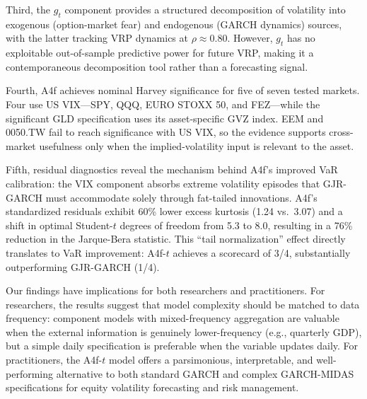 \documentclass[12pt,a4paper]{article}
\begin{document}
Third, the $g_t$ component provides a structured decomposition of volatility into exogenous (option-market fear) and endogenous (GARCH dynamics) sources, with the latter tracking VRP dynamics at $\rho \approx 0.80$. However, $g_t$ has no exploitable out-of-sample predictive power for future VRP, making it a contemporaneous decomposition tool rather than a forecasting signal.

Fourth, A4f achieves nominal Harvey significance for five of seven tested markets. Four use US VIX---SPY, QQQ, EURO STOXX 50, and FEZ---while the significant GLD specification uses its asset-specific GVZ index. EEM and 0050.TW fail to reach significance with US VIX, so the evidence supports cross-market usefulness only when the implied-volatility input is relevant to the asset.

Fifth, residual diagnostics reveal the mechanism behind A4f's improved VaR calibration: the VIX component absorbs extreme volatility episodes that GJR-GARCH must accommodate solely through fat-tailed innovations. A4f's standardized residuals exhibit 60\% lower excess kurtosis (1.24 vs.\ 3.07) and a shift in optimal Student-$t$ degrees of freedom from 5.3 to 8.0, resulting in a 76\% reduction in the Jarque-Bera statistic. This ``tail normalization'' effect directly translates to VaR improvement: A4f-$t$ achieves a scorecard of 3/4, substantially outperforming GJR-GARCH (1/4).

Our findings have implications for both researchers and practitioners. For researchers, the results suggest that model complexity should be matched to data frequency: component models with mixed-frequency aggregation are valuable when the external information is genuinely lower-frequency (e.g., quarterly GDP), but a simple daily specification is preferable when the variable updates daily. For practitioners, the A4f-$t$ model offers a parsimonious, interpretable, and well-performing alternative to both standard GARCH and complex GARCH-MIDAS specifications for equity volatility forecasting and risk management.
\end{document}
